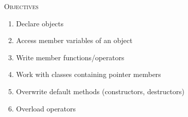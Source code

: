 \textsc{Objectives}
    \begin{enumerate}[nosep]
    \item Declare objects
    \item Access member variables of an object
    \item Write member functions/operators
    \item Work with classes containing pointer members
    \item Overwrite default methods (constructors, destructors)
    \item Overload operators
    \end{enumerate}
